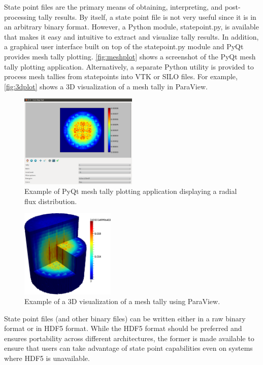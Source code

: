 \documentclass{snamc2013}
\begin{document}
State point files are the primary means of obtaining, interpreting, and
post-processing tally results.  By itself, a state point file is not very useful
since it is in an arbitrary binary format. However, a Python module,
statepoint.py, is available that makes it easy and intuitive to extract and
visualize tally results. In addition, a graphical user interface built on top of
the statepoint.py module and PyQt provides mesh tally
plotting. \autoref{fig:meshplot} shows a screenshot of the PyQt mesh tally
plotting application. Alternatively, a separate Python utility is provided to
process mesh tallies from statepoints into VTK or SILO files.  For example,
\autoref{fig:3dplot} shows a 3D visualization of a mesh tally in ParaView.
\begin{figure}[htb]
  \centering
  \includegraphics[width=0.5\textwidth]{images/plotmeshtally.png}
  \caption{Example of PyQt mesh tally plotting application displaying a radial
    flux distribution.}
  \label{fig:meshplot}
\end{figure}
\begin{figure}[htb]
  \centering
  \includegraphics[width=0.4\textwidth]{images/tallyplot.png}
  \caption{Example of a 3D visualization of a mesh tally using ParaView.}
  \label{fig:3dplot}
\end{figure}

State point files (and other binary files) can be written either in a raw binary
format or in HDF5 format. While the HDF5 format should be preferred and ensures
portability across different architectures, the former is made available to
ensure that users can take advantage of state point capabilities even on systems
where HDF5 is unavailable.
\end{document}
